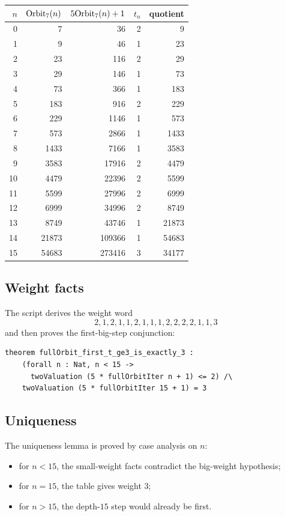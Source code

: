 \begin{center}
\scriptsize
\begin{tabular}{@{}rrrrr@{}}
\toprule
$n$ & $\mathrm{Orbit}_7(n)$ & $5\mathrm{Orbit}_7(n)+1$ & $t_n$ & quotient \\
\midrule
0 & 7 & 36 & 2 & 9 \\
1 & 9 & 46 & 1 & 23 \\
2 & 23 & 116 & 2 & 29 \\
3 & 29 & 146 & 1 & 73 \\
4 & 73 & 366 & 1 & 183 \\
5 & 183 & 916 & 2 & 229 \\
6 & 229 & 1146 & 1 & 573 \\
7 & 573 & 2866 & 1 & 1433 \\
8 & 1433 & 7166 & 1 & 3583 \\
9 & 3583 & 17916 & 2 & 4479 \\
10 & 4479 & 22396 & 2 & 5599 \\
11 & 5599 & 27996 & 2 & 6999 \\
12 & 6999 & 34996 & 2 & 8749 \\
13 & 8749 & 43746 & 1 & 21873 \\
14 & 21873 & 109366 & 1 & 54683 \\
15 & 54683 & 273416 & 3 & 34177 \\
\bottomrule
\end{tabular}
\end{center}

\subsection{Weight facts}

The script derives the weight word
\begin{equation*}
  2,1,2,1,1,2,1,1,1,2,2,2,2,1,1,3
\end{equation*}
and then proves the first-big-step conjunction:
\begin{verbatim}
theorem fullOrbit_first_t_ge3_is_exactly_3 :
    (forall n : Nat, n < 15 ->
      twoValuation (5 * fullOrbitIter n + 1) <= 2) /\
    twoValuation (5 * fullOrbitIter 15 + 1) = 3
\end{verbatim}

\subsection{Uniqueness}

The uniqueness lemma is proved by case analysis on $n$:
\begin{itemize}[leftmargin=*]
\item for $n<15$, the small-weight facts contradict the big-weight
  hypothesis;
\item for $n=15$, the table gives weight $3$;
\item for $n>15$, the depth-$15$ step would already be first.
\end{itemize}

